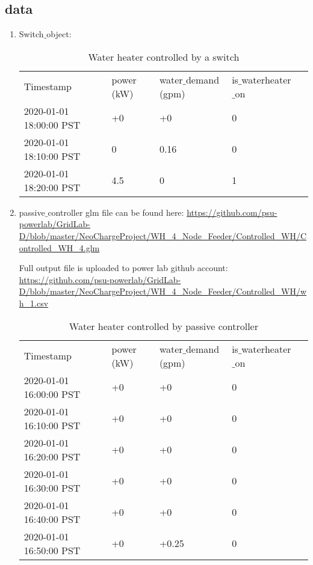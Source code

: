 \subsection{data}
    \begin{enumerate}
        \item Switch$\_$object:
        

\begin{table}[h]
\begin{tabular}{|l|l|l|l|l}

\cline{1-4}
Timestamp & power (kW) & water$\_$demand (gpm) & is$\_$waterheater$\_$on & \\ \cline{1-4}
2020-01-01 18:00:00 PST & +0 & +0 & 0 & \\ \cline{1-4}
2020-01-01 18:10:00 PST & 0 & 0.16 & 0 &  \\ \cline{1-4}
2020-01-01 18:20:00 PST & 4.5 & 0 & 1 &  \\ \cline{1-4}
\end{tabular}
\caption{Water heater controlled by a switch}
\label{table:1}
\end{table}

        \item passive$\_$controller \newline
        glm file can be found here: \url{https://github.com/psu-powerlab/GridLab-D/blob/master/NeoChargeProject/WH_4_Node_Feeder/Controlled_WH/Controlled_WH_4.glm} \newline \par
        
        Full output file is uploaded to power lab github account: \url{https://github.com/psu-powerlab/GridLab-D/blob/master/NeoChargeProject/WH_4_Node_Feeder/Controlled_WH/wh_1.csv}
        
        \begin{table}[h]
        \begin{tabular}{|l|l|l|l|l}
        \cline{1-4}
        Timestamp & power (kW) & water$\_$demand (gpm) & is$\_$waterheater$\_$on & \\ \cline{1-4}
        2020-01-01 16:00:00 PST & +0 & +0 & 0 & \\ \cline{1-4}
        2020-01-01 16:10:00 PST & +0 & +0 & 0 &  \\ \cline{1-4}
        2020-01-01 16:20:00 PST & +0 & +0 & 0 &  \\ \cline{1-4}
        2020-01-01 16:30:00 PST & +0 & +0 & 0 &  \\ \cline{1-4}
        2020-01-01 16:40:00 PST & +0 & +0 & 0 &  \\ \cline{1-4}
        2020-01-01 16:50:00 PST & +0 & +0.25 & 0 &  \\ \cline{1-4}
        \end{tabular}
        \caption{Water heater controlled by passive controller}
        \label{table:2}
        \end{table}
        

\end{enumerate}
